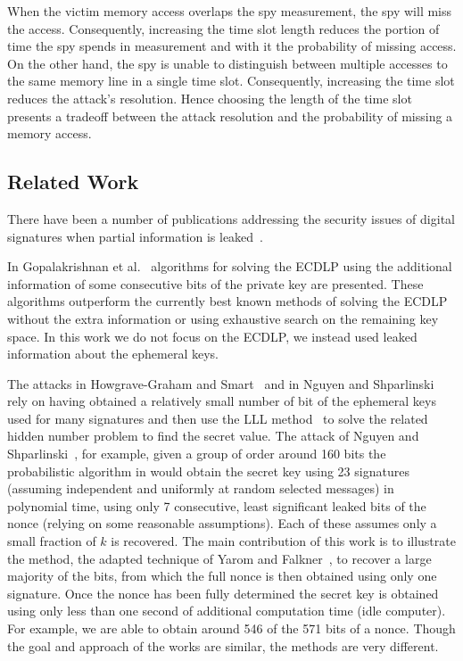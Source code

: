 \documentclass[twocolumn]{svjour3}
\begin{document}
When the victim memory access overlaps the spy measurement, the spy will miss the access.
Consequently, increasing the time slot length reduces the portion of time the spy spends in
measurement and with it the probability of missing access.
On the other hand, the spy is unable to distinguish between multiple accesses to the same memory line in 
a single time slot.
Consequently, increasing the time slot reduces the attack's resolution.
Hence choosing the length of the time slot presents a tradeoff between the attack resolution
and the probability of missing a memory access.


\subsection{Related Work}\label{sec:related}
There have been a number of publications addressing the security issues of digital signatures when partial information is leaked~\cite{Howgrave-GrahamS01,gopalakrishnan07solving,nguyen03insecurity}. 

In Gopalakrishnan et al.~\cite{gopalakrishnan07solving} algorithms for solving the ECDLP using the additional information of some consecutive bits of the private key are presented. These algorithms outperform the currently best known methods of solving the ECDLP without the extra information or using exhaustive search on the remaining key space. In this work we do not focus on the ECDLP, we instead used leaked information about the ephemeral keys. 

The attacks in Howgrave-Graham and Smart~\cite{Howgrave-GrahamS01} and in Nguyen and Shparlinski~\cite{nguyen03insecurity} 
rely on having obtained a relatively small number of bit of the ephemeral keys used for many signatures and then use the LLL method~\cite{LLL} to solve the related hidden number problem to find the secret value.
 The attack of Nguyen and Shparlinski~\cite{nguyen03insecurity}, for example, given a group of order around 160 bits the probabilistic algorithm in would obtain the secret key using 23 signatures (assuming independent and uniformly at random selected messages) in polynomial time, using only 7 consecutive, least significant leaked bits of the nonce (relying on some reasonable assumptions). Each of these assumes only a small fraction of $k$ is recovered. The main contribution of this work is to illustrate the method, the adapted technique of Yarom and Falkner~\cite{yarom13flush}, to recover a large majority of the bits, from which the full nonce is then obtained using only one signature. Once the nonce has been fully determined the secret key is obtained using only less than one second of additional computation time (idle computer). 
For example, we are able to obtain around 546 of the 571 bits of a nonce. Though the goal and approach of the works are similar, the methods are very different.
\end{document}
